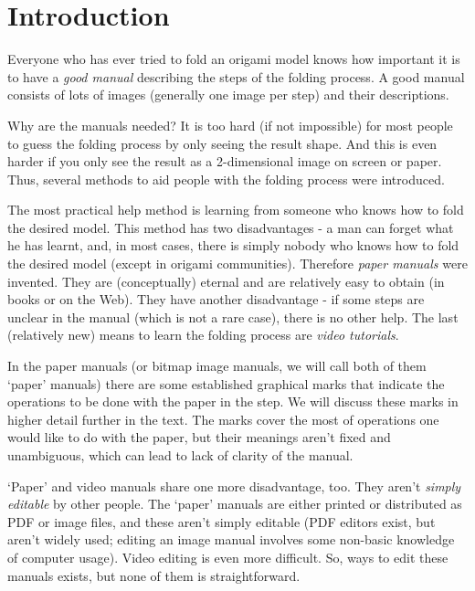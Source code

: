
\chapter*{Introduction}

Everyone who has ever tried to fold an origami model knows how important it is to have a \emph{good manual} describing the steps of the folding process. A good manual consists of lots of images (generally one image per step) and their descriptions. 

Why are the manuals needed? It is too hard (if not impossible) for most people to guess the folding process by only seeing the result shape. And this is even harder if you only see the result as a 2-dimensional image on screen or paper. Thus, several methods to aid people with the folding process were introduced.

The most practical help method is learning from someone who knows how to fold the desired model. This method has two disadvantages - a man can forget what he has learnt, and, in most cases, there is simply nobody who knows how to fold the desired model (except in origami communities). Therefore \emph{paper manuals} were invented. They are (conceptually) eternal and are relatively easy to obtain (in books or on the Web). They have another disadvantage - if some steps are unclear in the manual (which is not a rare case), there is no other help. The last (relatively new) means to learn the folding process are \emph{video tutorials}.

In the paper manuals (or bitmap image manuals, we will call both of them `paper' manuals) there are some established graphical marks that indicate the operations to be done with the paper in the step. We will discuss these marks in higher detail further in the text. The marks cover the most of operations one would like to do with the paper, but their meanings aren't fixed and unambiguous, which can lead to lack of clarity of the manual.

`Paper' and video manuals share one more disadvantage, too. They aren't \emph{simply editable} by other people. The `paper' manuals are either printed or distributed as PDF or image files, and these aren't simply editable (PDF editors exist, but aren't widely used; editing an image manual involves some non-basic knowledge of computer usage). Video editing is even more difficult. So, ways to edit these manuals exists, but none of them is straightforward.

